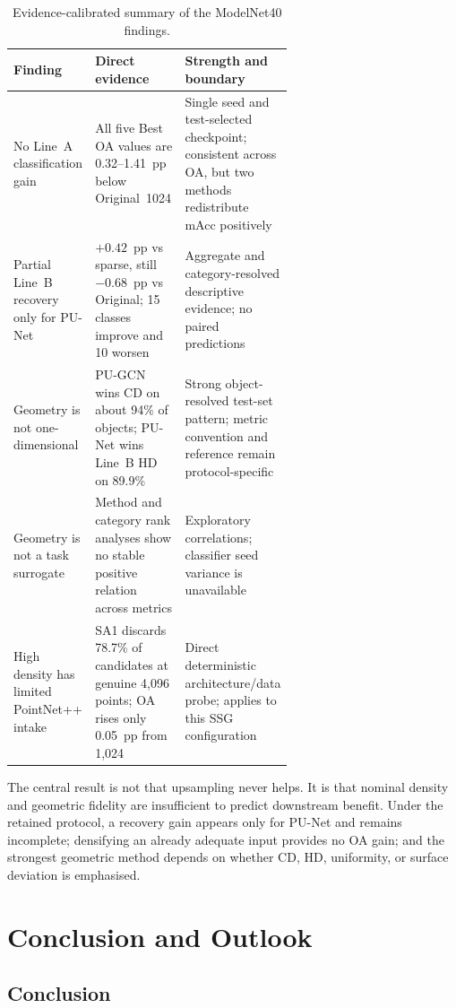 \begin{table}[htbp]
\centering
\small
\begin{tabularx}{\linewidth}{p{0.23\linewidth}p{0.39\linewidth}X}
\toprule
Finding & Direct evidence & Strength and boundary \\
\midrule
No Line~A classification gain & All five Best OA values are 0.32--1.41~pp below Original~1024 & Single seed and test-selected checkpoint; consistent across OA, but two methods redistribute mAcc positively \\
Partial Line~B recovery only for PU-Net & $+0.42$~pp vs sparse, still $-0.68$~pp vs Original; 15 classes improve and 10 worsen & Aggregate and category-resolved descriptive evidence; no paired predictions \\
Geometry is not one-dimensional & PU-GCN wins CD on about 94\% of objects; PU-Net wins Line~B HD on 89.9\% & Strong object-resolved test-set pattern; metric convention and reference remain protocol-specific \\
Geometry is not a task surrogate & Method and category rank analyses show no stable positive relation across metrics & Exploratory correlations; classifier seed variance is unavailable \\
High density has limited PointNet++ intake & SA1 discards 78.7\% of candidates at genuine 4,096 points; OA rises only 0.05~pp from 1,024 & Direct deterministic architecture/data probe; applies to this SSG configuration \\
\bottomrule
\end{tabularx}
\caption{Evidence-calibrated summary of the ModelNet40 findings.}
\label{tab:evidence-summary}
\end{table}

The central result is not that upsampling never helps. It is that nominal density and geometric fidelity are insufficient to predict downstream benefit. Under the retained protocol, a recovery gain appears only for PU-Net and remains incomplete; densifying an already adequate input provides no OA gain; and the strongest geometric method depends on whether CD, HD, uniformity, or surface deviation is emphasised.

\chapter{Conclusion and Outlook}
\label{chap:conclusion}

\section{Conclusion}

